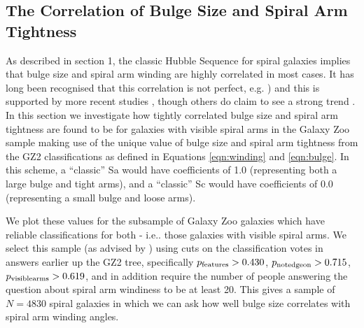 \documentclass[usenatbib]{mn2e}
\begin{document}

\subsection{The Correlation of Bulge Size and Spiral Arm Tightness}

As described in section 1, the classic Hubble Sequence for spiral galaxies implies that bulge size and spiral arm winding are highly correlated in most cases. It has long been recognised that this correlation is not perfect, e.g. \citealt{1970ApJ...160..811F, kennicutt1981}) and this is supported by more recent studies \citet{Hart2017b,Hart2018}, though others do claim to see a strong trend \citet{Davis2015}. In this section we investigate how tightly correlated bulge size and spiral arm tightness are found to be for galaxies with visible spiral arms in the Galaxy Zoo sample making use of the unique value of bulge size and spiral arm tightness from the GZ2 classifications as defined in Equations \ref{eqn:winding} and \ref{eqn:bulge}. In this scheme, a ``classic'' Sa would have coefficients of 1.0 (representing both a large bulge and tight arms), and a ``classic'' Sc would have coefficients of 0.0 (representing a small bulge and loose arms). 

We plot these values for the subsample of Galaxy Zoo galaxies which have reliable classifications for both - i.e.. those galaxies with visible spiral arms. We select this sample (as advised by \citealt{Willett2013}) using cuts on the classification votes in answers earlier up the GZ2 tree, specifically $p_{\rm features} > 0.430$, $p_{\rm notedgeon} > 0.715$, $p_{\rm visiblearms} > 0.619$, and in addition require the number of people answering the question about spiral arm windiness to be at least 20. This gives a sample of $N = 4830$ spiral galaxies in which we can ask how well bulge size correlates with spiral arm winding angles.
 
\end{document}
